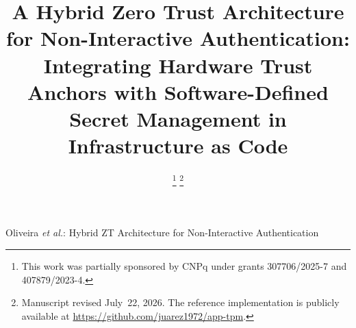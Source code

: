\documentclass[journal]{IEEEtran}
\begin{document}
\title{A Hybrid Zero Trust Architecture for Non-Interactive Authentication:
Integrating Hardware Trust Anchors with Software-Defined Secret Management
in Infrastructure as Code}

\author{
%
\thanks{This work was partially sponsored by CNPq under grants
307706/2025-7 and 407879/2023-4.}%
\thanks{Manuscript revised July~22, 2026. The reference implementation is
publicly available at \url{https://github.com/juarez1972/app-tpm}.}}

%
{Oliveira \MakeLowercase{\textit{et al.}}: Hybrid ZT Architecture for Non-Interactive Authentication}

\maketitle
\end{document}
